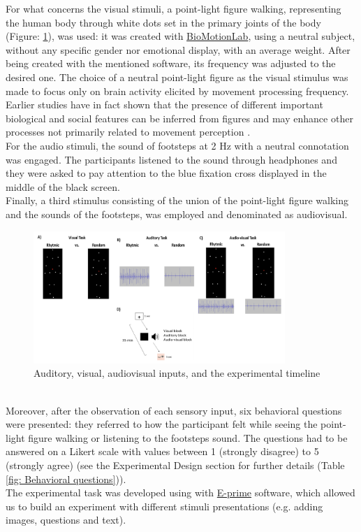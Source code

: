 For what concerns the visual stimuli, a point-light figure walking, representing the human body through white dots set in the primary joints of the body (Figure: \ref{fig: visual stimuli}), was used: it was created with \href{https://www.biomotionlab.ca/html5-bml-walker/}{BioMotionLab}, using a neutral subject, without any specific gender nor emotional display, with an average weight. After being created with the mentioned software, its frequency was adjusted to the desired one. The choice of a neutral point-light figure as the visual stimulus was made to focus only on brain activity elicited by movement processing frequency. Earlier studies have in fact shown that the presence of different important biological and social features can be inferred from figures and may enhance other processes not primarily related to movement perception \parencite{Cracco_2022}. \\
For the audio stimuli, the sound of footsteps at 2 Hz with a neutral connotation was engaged. The participants listened to the sound through headphones and they were asked to pay attention to the blue fixation cross displayed in the middle of the black screen. \\
Finally, a third stimulus consisting of the union of the point-light figure walking and the sounds of the footsteps, was employed and denominated as audiovisual. 
\begin{figure}[h]
    \centering
        \includegraphics[width=0.85\textwidth]{appendix/Picture 1.png}
        \caption{Auditory, visual, audiovisual inputs, and the experimental timeline}
        \label{fig: visual stimuli}
\end{figure} \\
Moreover, after the observation of each sensory input, six behavioral questions were presented: they referred to how the participant felt while seeing the point-light figure walking or listening to the footsteps sound. The questions had to be answered on a Likert scale with values between 1 (strongly disagree) to 5 (strongly agree) (see the Experimental Design section for further details (Table \ref{fig: Behavioral questions})). \\
The experimental task was developed using with \href{https://pstnet.com/products/e-prime/}{E-prime} software, which allowed us to build an experiment with different stimuli presentations (e.g. adding images, questions and text).

